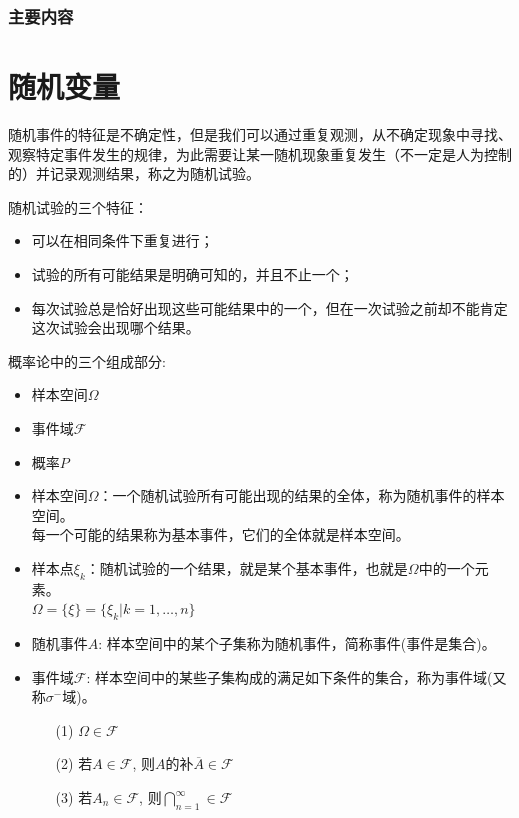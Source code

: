 \begin{frame}
  \frametitle{主要内容}
  \tableofcontents[hideallsubsections]
\end{frame}

\section{随机变量}

\begin{frame}
随机事件的特征是不确定性，但是我们可以通过重复观测，从不确定现象中寻找、观察特定事件发生的规律，为此需要让某一随机现象重复发生（不一定是人为控制的）并记录观测结果，称之为随机试验。

随机试验的三个特征：
\begin{itemize}
	\item 可以在相同条件下重复进行；
	\item 试验的所有可能结果是明确可知的，并且不止一个；
	\item 每次试验总是恰好出现这些可能结果中的一个，但在一次试验之前却不能肯定这次试验会出现哪个结果。
\end{itemize}

\end{frame}

\begin{frame}

概率论中的三个组成部分:
\begin{itemize}
	\item 样本空间$\Omega$
	\item 事件域$\mathcal{F}$
	\item 概率$P$
\end{itemize}
\end{frame}


\begin{frame}
\begin{itemize}
	\item 样本空间$\Omega$：一个随机试验所有可能出现的结果的全体，称为随机事件的样本空间。\\
	每一个可能的结果称为基本事件，它们的全体就是样本空间。
	\item 样本点$\xi_k$：随机试验的一个结果，就是某个基本事件，也就是$\Omega$中的一个元素。\\
	$\Omega=\{\xi\}=\{\xi_k|k=1,\dots,n\}$
	\item 随机事件$A$: 样本空间中的某个子集称为随机事件，简称事件(事件是集合)。
    \item 事件域$\mathcal{F}$: 样本空间中的某些子集构成的满足如下条件的集合，称为事件域(又称$\sigma^-$域)。
	\begin{itemize}
		\item[(1)] $\Omega\in\mathcal{F}$
		\item[(2)] 若$A\in\mathcal{F}$, 则$A$的补$\overline{A}\in\mathcal{F}$
		\item[(3)] 若$A_n\in\mathcal{F}$, 则$\bigcap_{n=1}^{\infty}\in\mathcal{F}$
	\end{itemize}
\end{itemize}
\end{frame}

